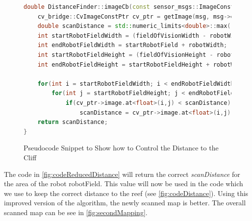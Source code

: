 \documentclass[twoside, 12pt]{article}
\begin{document}
\begin{figure}
\vspace{-2pt}
\begin{lstlisting}[language=C++]
double DistanceFinder::imageCb(const sensor_msgs::ImageConstPtr& msg) {
	cv_bridge::CvImageConstPtr cv_ptr = getImage(msg, msg->encoding);
	double scanDistance = std::numeric_limits<double>::max();
	int startRobotFieldWidth = (fieldOfVisionWidth - robotWidth)/2;
	int endRobotFieldWidth = startRobotField + robotWidth;
	int startRobotFieldHeight = (fieldOfVisionHeight - robotHeight)/2;
	int endRobotFieldHeight = startRobotFieldHeight + robotWidth;
	
	for(int i = startRobotFieldWidth; i < endRobotFieldWidth; i++)
		for(int j = startRobotFieldHeight; j < endRobotFieldHeight; j++)
			if(cv_ptr->image.at<float>(i,j) < scanDistance)
				scanDistance = cv_ptr->image.at<float>(i,j);
	return scanDistance;
}
\end{lstlisting} 
\vspace{-38pt}
  \caption{Pseudocode Snippet to Show how to Control the Distance to the Cliff}
  \label{fig:codeReducedDistance}
  \vspace{60pt}
\end{figure}

\begin{figure}
\vspace{-50pt}
\end{figure}

The code in \autoref{fig:codeReducedDistance} will return the correct \textit{scanDistance} for the area of the robot robotField. This value will now be used in the code which we use to keep the correct distance to the reef (see \autoref{fig:codeDistance}). Using this improved version of the algorithm, the newly scanned map is better. The overall scanned map can be see in \autoref{fig:secondMapping}.\\
\end{document}
